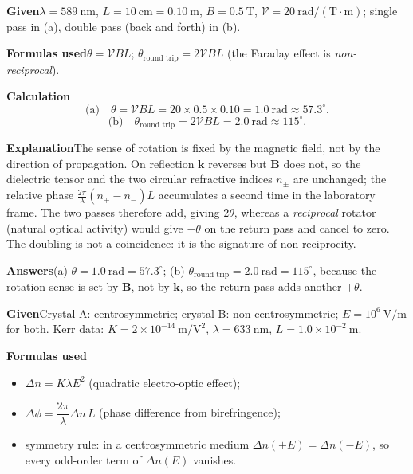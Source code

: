 \documentclass[10.5pt]{ctexart}
\newcommand{\vdt}{\mathcal{V}}
\begin{document}
\textbf{Given}\quad $\lambda=589\ \mathrm{nm}$, $L=10\ \mathrm{cm}=0.10\ \mathrm{m}$, $B=0.5\ \mathrm{T}$,
$\vdt=20\ \mathrm{rad/(T\cdot m)}$; single pass in (a), double pass (back and forth) in (b).

\textbf{Formulas used}\quad $\theta=\vdt BL$;\quad
$\theta_{\text{round trip}}=2\vdt BL$ (the Faraday effect is \emph{non-reciprocal}).

\textbf{Calculation}\quad
\begin{equation*}
\text{(a)}\quad \theta=\vdt BL=20\times0.5\times0.10=1.0\ \mathrm{rad}\approx57.3^{\circ}.
\end{equation*}
\begin{equation*}
\text{(b)}\quad \theta_{\text{round trip}}=2\vdt BL=2.0\ \mathrm{rad}\approx115^{\circ}.
\end{equation*}

\textbf{Explanation}\quad The sense of rotation is fixed by the magnetic field, not by the direction of
propagation. On reflection $\mathbf k$ reverses but $\mathbf B$ does not, so the dielectric tensor and the two
circular refractive indices $n_\pm$ are unchanged; the relative phase $\frac{2\pi}{\lambda}(n_+-n_-)L$
accumulates a second time in the laboratory frame. The two passes therefore add, giving $2\theta$, whereas a
\emph{reciprocal} rotator (natural optical activity) would give $-\theta$ on the return pass and cancel to zero.
The doubling is not a coincidence: it is the signature of non-reciprocity.

\textbf{Answers}\quad (a) $\theta=1.0\ \mathrm{rad}=57.3^{\circ}$;\qquad
(b) $\theta_{\text{round trip}}=2.0\ \mathrm{rad}=115^{\circ}$, because the rotation sense is set by
$\mathbf B$, not by $\mathbf k$, so the return pass adds another $+\theta$.


\textbf{Given}\quad Crystal A: centrosymmetric; crystal B: non-centrosymmetric; $E=10^{6}\ \mathrm{V/m}$ for both.
Kerr data: $K=2\times10^{-14}\ \mathrm{m/V^{2}}$, $\lambda=633\ \mathrm{nm}$, $L=1.0\times10^{-2}\ \mathrm{m}$.

\textbf{Formulas used}\quad
\begin{itemize}
\item $\Delta n=K\lambda E^{2}$ (quadratic electro-optic effect);
\item $\Delta\phi=\dfrac{2\pi}{\lambda}\Delta n\,L$ (phase difference from birefringence);
\item symmetry rule: in a centrosymmetric medium $\Delta n(+E)=\Delta n(-E)$, so every odd-order
      term of $\Delta n(E)$ vanishes.
\end{itemize}
\end{document}
